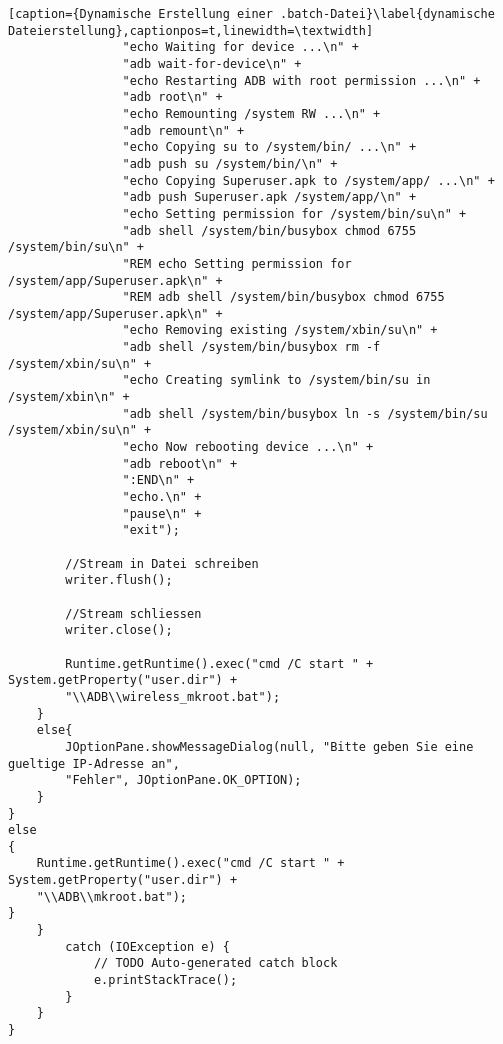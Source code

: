 \begin{flushleft}
\begin{lstlisting}[caption={Dynamische Erstellung einer .batch-Datei}\label{dynamische Dateierstellung},captionpos=t,linewidth=\textwidth]
				"echo Waiting for device ...\n" +
				"adb wait-for-device\n" +
				"echo Restarting ADB with root permission ...\n" +
				"adb root\n" +
				"echo Remounting /system RW ...\n" +
				"adb remount\n" +
				"echo Copying su to /system/bin/ ...\n" +
				"adb push su /system/bin/\n" +
				"echo Copying Superuser.apk to /system/app/ ...\n" +
				"adb push Superuser.apk /system/app/\n" +
				"echo Setting permission for /system/bin/su\n" +
				"adb shell /system/bin/busybox chmod 6755 /system/bin/su\n" +
				"REM echo Setting permission for /system/app/Superuser.apk\n" +
				"REM adb shell /system/bin/busybox chmod 6755 /system/app/Superuser.apk\n" +
				"echo Removing existing /system/xbin/su\n" +
				"adb shell /system/bin/busybox rm -f /system/xbin/su\n" +
				"echo Creating symlink to /system/bin/su in /system/xbin\n" +
				"adb shell /system/bin/busybox ln -s /system/bin/su /system/xbin/su\n" +
				"echo Now rebooting device ...\n" +
				"adb reboot\n" +
				":END\n" +
				"echo.\n" +
				"pause\n" +
				"exit");
				
		//Stream in Datei schreiben
		writer.flush();
								
		//Stream schliessen
		writer.close();
								
		Runtime.getRuntime().exec("cmd /C start " + System.getProperty("user.dir") + 
		"\\ADB\\wireless_mkroot.bat");
	}
	else{
		JOptionPane.showMessageDialog(null, "Bitte geben Sie eine gueltige IP-Adresse an", 
		"Fehler", JOptionPane.OK_OPTION);
	}
}
else
{
	Runtime.getRuntime().exec("cmd /C start " + System.getProperty("user.dir") + 
	"\\ADB\\mkroot.bat");
}	
	}
		catch (IOException e) {
			// TODO Auto-generated catch block
			e.printStackTrace();
		}
	}
}
\end{lstlisting}

\end{flushleft}
